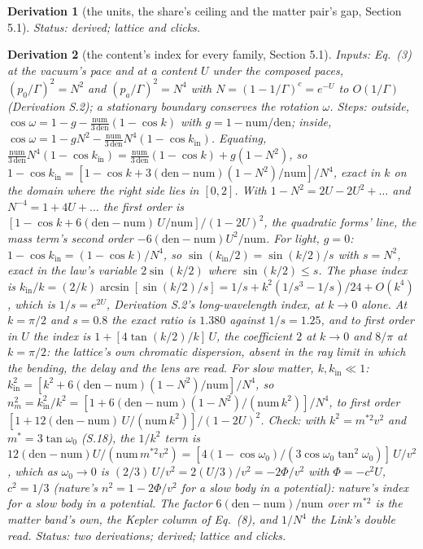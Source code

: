 \documentclass[pdflatex,sn-mathphys-num]{sn-jnl}
\newcommand{\num}{\mathrm{num}}
\newcommand{\den}{\mathrm{den}}
\theoremstyle{thmstyleone}
\newtheorem{derivation}{Derivation}
\begin{document}
\begin{derivation}[the units, the share's ceiling and the matter pair's gap, Section 5.1]
 \emph{Status:} derived; lattice and clicks.
\end{derivation}


\begin{derivation}[the content's index for every family, Section 5.1]
\emph{Inputs:} Eq.~(3) at the vacuum's pace and at a content $U$ under the composed paces, $(p_0 / \Gamma)^2 = N^2$ and $(p_a / \Gamma)^2 = N^4$ with $N = (1 - 1 / \Gamma)^c = e^{-U}$ to $O(1 / \Gamma)$ (Derivation S.2); a stationary boundary conserves the rotation $\omega$. \emph{Steps:} outside, $\cos\omega = 1 - g - \frac{\num}{3\,\den}(1 - \cos k)$ with $g = 1 - \num / \den$; inside, $\cos\omega = 1 - gN^2 - \frac{\num}{3\,\den}N^4(1 - \cos k_{\mathrm{in}})$. Equating, $\frac{\num}{3\,\den}N^4(1 - \cos k_{\mathrm{in}}) = \frac{\num}{3\,\den}(1 - \cos k) + g(1 - N^2)$, so $1 - \cos k_{\mathrm{in}} = [1 - \cos k + 3(\den - \num)(1 - N^2) / \num] / N^4$, exact in $k$ on the domain where the right side lies in $[0, 2]$. With $1 - N^2 = 2U - 2U^2 + \dots$ and $N^{-4} = 1 + 4U + \dots$ the first order is $[1 - \cos k + 6(\den - \num)\,U / \num] / (1 - 2U)^2$, the quadratic forms' line, the mass term's second order $-6(\den - \num)U^2 / \num$. For light, $g = 0$: $1 - \cos k_{\mathrm{in}} = (1 - \cos k) / N^4$, so $\sin(k_{\mathrm{in}} / 2) = \sin(k / 2) / s$ with $s = N^2$, exact in the law's variable $2\sin(k / 2)$ where $\sin(k / 2) \le s$. The phase index is $k_{\mathrm{in}} / k = (2 / k)\arcsin[\sin(k / 2) / s] = 1 / s + k^2(1 / s^3 - 1 / s) / 24 + O(k^4)$, which is $1 / s = e^{2U}$, Derivation S.2's long-wavelength index, at $k \to 0$ alone. At $k = \pi / 2$ and $s = 0.8$ the exact ratio is $1.380$ against $1 / s = 1.25$, and to first order in $U$ the index is $1 + [4\tan(k / 2) / k]\,U$, the coefficient $2$ at $k \to 0$ and $8 / \pi$ at $k = \pi / 2$: the lattice's own chromatic dispersion, absent in the ray limit in which the bending, the delay and the lens are read. For slow matter, $k, k_{\mathrm{in}} \ll 1$: $k_{\mathrm{in}}^2 = [k^2 + 6(\den - \num)(1 - N^2) / \num] / N^4$, so $n_m^2 = k_{\mathrm{in}}^2 / k^2 = [1 + 6(\den - \num)(1 - N^2) / (\num\,k^2)] / N^4$, to first order $[1 + 12(\den - \num)\,U / (\num\,k^2)] / (1 - 2U)^2$. \emph{Check:} with $k^2 = m^{*2} v^2$ and $m^* = 3\tan\omega_0$ (S.18), the $1 / k^2$ term is $12(\den - \num) U / (\num\,m^{*2} v^2) = [4(1 - \cos\omega_0) / (3\cos\omega_0\tan^2\omega_0)]\,U / v^2$, which as $\omega_0 \to 0$ is $(2 / 3)\,U / v^2 = 2(U / 3) / v^2 = -2\Phi / v^2$ with $\Phi = -c^2 U$, $c^2 = 1 / 3$ (nature's $n^2 = 1 - 2\Phi / v^2$ for a slow body in a potential): nature's index for a slow body in a potential. The factor $6(\den - \num) / \num$ over $m^{*2}$ is the matter band's own, the Kepler column of Eq.~(8), and $1 / N^4$ the Link's double read.
 \emph{Status:} two derivations; derived; lattice and clicks.
\end{derivation}
\end{document}
